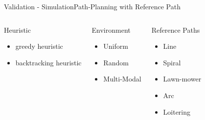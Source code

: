 \begin{frame}{Validation - Simulation}{Path-Planning with Reference Path}

\begin{columns}[t]

\begin{block}{Heuristic}
\begin{itemize}
\item greedy heuristic 
\item backtracking heuristic
\end{itemize}
\end{block}

\begin{block}{Environment}
\begin{itemize}
\item Uniform
\item Random	
\item Multi-Modal
\end{itemize}
\end{block}

\begin{block}{Reference Paths}
\begin{itemize}
\item Line
\item Spiral
\item Lawn-mower
\item Arc
\item Loitering
\end{itemize}
\end{block}

\end{columns}

\end{frame}



